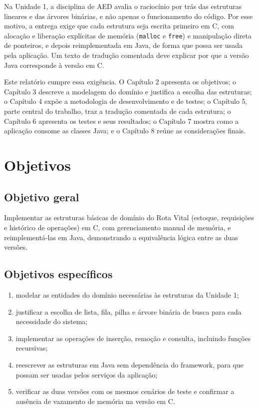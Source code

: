 \documentclass[12pt,a4paper,oneside]{report}
\newcommand{\cod}[1]{\texttt{#1}}
\begin{document}
Na Unidade 1, a disciplina de AED avalia o raciocínio por trás das estruturas lineares e das árvores binárias, e não apenas o funcionamento do código. Por esse motivo, a entrega exige que cada estrutura seja escrita primeiro em C, com alocação e liberação explícitas de memória (\cod{malloc} e \cod{free}) e manipulação direta de ponteiros, e depois reimplementada em Java, de forma que possa ser usada pela aplicação. Um texto de tradução comentada deve explicar por que a versão Java corresponde à versão em C.

Este relatório cumpre essa exigência. O Capítulo 2 apresenta os objetivos; o Capítulo 3 descreve a modelagem do domínio e justifica a escolha das estruturas; o Capítulo 4 expõe a metodologia de desenvolvimento e de testes; o Capítulo 5, parte central do trabalho, traz a tradução comentada de cada estrutura; o Capítulo 6 apresenta os testes e seus resultados; o Capítulo 7 mostra como a aplicação consome as classes Java; e o Capítulo 8 reúne as considerações finais.

\chapter{Objetivos}

\section{Objetivo geral}

Implementar as estruturas básicas de domínio do Rota Vital (estoque, requisições e histórico de operações) em C, com gerenciamento manual de memória, e reimplementá-las em Java, demonstrando a equivalência lógica entre as duas versões.

\section{Objetivos específicos}

\begin{enumerate}[label=\alph*), leftmargin=1.9cm, itemsep=0pt]
  \item modelar as entidades do domínio necessárias às estruturas da Unidade 1;
  \item justificar a escolha de lista, fila, pilha e árvore binária de busca para cada necessidade do sistema;
  \item implementar as operações de inserção, remoção e consulta, incluindo funções recursivas;
  \item reescrever as estruturas em Java sem dependência do framework, para que possam ser usadas pelos serviços da aplicação;
  \item verificar as duas versões com os mesmos cenários de teste e confirmar a ausência de vazamento de memória na versão em C.
\end{enumerate}
\end{document}
